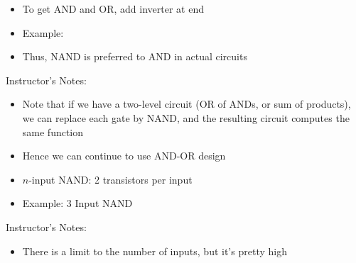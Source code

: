 \begin{frame}[fragile]
\begin{itemize}
\item To get AND and OR, add inverter at end

\item Example: 
\item Thus, NAND is preferred to AND in actual circuits
\end{itemize}
\end{frame}
\BNotes\ifnum{}
\begin{frame}[fragile]
Instructor's Notes:
\begin{itemize}
\item Note that if we have a two-level circuit (OR of ANDs, or sum of products), we can replace each gate by NAND, and the resulting circuit computes the same function
\item Hence we can continue to use AND-OR design
\end{itemize}
\end{frame}
\fi\ENotes



\begin{frame}[fragile]
\begin{itemize}
\item $n$-input NAND: 2 transistors per input

\item Example: 3 Input NAND
\end{itemize}
\end{frame}
\BNotes\ifnum{}
\begin{frame}[fragile]
Instructor's Notes:
\begin{itemize}
\item There is a limit to the number of inputs, but it's pretty high
\end{itemize}
\end{frame}
\fi\ENotes



